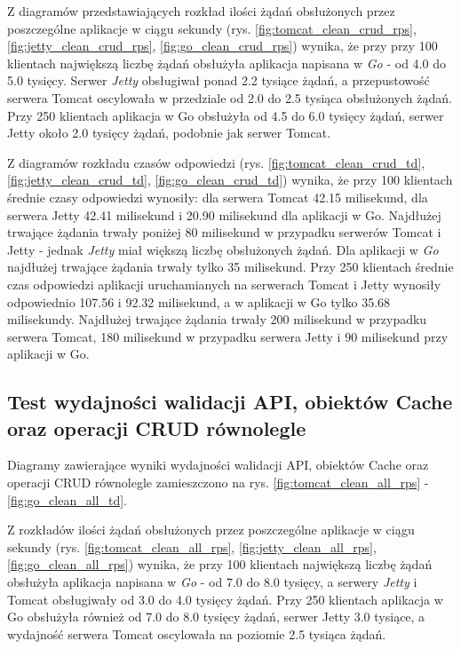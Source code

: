 Z diagramów przedstawiających rozkład ilości żądań obsłużonych przez poszczególne aplikacje w ciągu sekundy (rys. \ref{fig:tomcat_clean_crud_rps}, \ref{fig:jetty_clean_crud_rps}, \ref{fig:go_clean_crud_rps}) wynika, że przy przy 100 klientach największą liczbę żądań obsłużyła aplikacja napisana w \textsl{Go} - od 4.0 do 5.0 tysięcy. Serwer \textsl{Jetty} obsługiwał ponad 2.2 tysiące żądań, a przepustowość serwera Tomcat oscylowała w przedziale od 2.0 do 2.5 tysiąca obsłużonych żądań. Przy 250 klientach aplikacja w Go obsłużyła od 4.5 do 6.0 tysięcy żądań, serwer Jetty około 2.0 tysięcy żądań, podobnie jak serwer Tomcat.

Z diagramów rozkładu czasów odpowiedzi (rys. \ref{fig:tomcat_clean_crud_td}, \ref{fig:jetty_clean_crud_td}, \ref{fig:go_clean_crud_td}) wynika, że przy 100 klientach średnie czasy odpowiedzi wynosiły: dla serwera Tomcat 42.15  milisekund, dla serwera Jetty 42.41  milisekund i 20.90 milisekund dla aplikacji w Go.  Najdłużej trwające żądania trwały poniżej 80 milisekund w przypadku serwerów Tomcat i Jetty - jednak \textsl{Jetty} miał większą liczbę obsłużonych żądań. Dla aplikacji w \textsl{Go} najdłużej trwające żądania trwały tylko 35 milisekund. Przy 250 klientach średnie czas odpowiedzi aplikacji uruchamianych na serwerach Tomcat i Jetty  wynosiły  odpowiednio 107.56 i 92.32 milisekund, a w aplikacji w Go tylko 35.68 milisekundy. Najdłużej trwające żądania trwały 200 milisekund w przypadku serwera Tomcat, 180 milisekund w przypadku serwera Jetty i 90 milisekund przy aplikacji w Go. 

% 
\clearpage

\subsection{Test wydajności walidacji API, obiektów Cache oraz operacji CRUD równolegle}
Diagramy zawierające wyniki wydajności walidacji API, obiektów Cache oraz operacji CRUD równolegle zamieszczono na rys. \ref{fig:tomcat_clean_all_rps} - \ref{fig:go_clean_all_td}.                                                                  

Z rozkładów ilości żądań obsłużonych przez poszczególne aplikacje w ciągu sekundy (rys. \ref{fig:tomcat_clean_all_rps}, \ref{fig:jetty_clean_all_rps}, \ref{fig:go_clean_all_rps}) wynika, że przy 100 klientach największą liczbę żądań obsłużyła aplikacja napisana w \textsl{Go} - od 7.0 do 8.0 tysięcy, a serwery \textsl{Jetty} i Tomcat obsługiwały od 3.0 do 4.0  tysięcy żądań. Przy 250 klientach aplikacja w Go obsłużyła również od 7.0 do 8.0 tysięcy żądań, serwer Jetty 3.0 tysiące, a wydajność serwera Tomcat oscylowała na poziomie 2.5 tysiąca żądań. 
 
